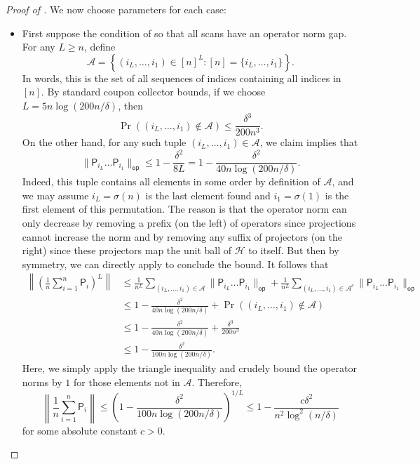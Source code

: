 \documentclass[10pt,a4paper]{amsart}
\begin{document}
\begin{proof}[Proof of ]
    We now choose parameters for each case:
    \begin{itemize}
        \item First suppose the condition of  so that all scans have an operator norm gap. For any $L\geq n$, define 
        \begin{equation*}
            \mathcal{A} =\left\{(i_L,\ldots,i_1)\in [n]^L: [n] = \{i_L,\ldots,i_1\}\right\}.
        \end{equation*}
        In words, this is the set of all sequences of indices containing all indices in $[n]$. By standard coupon collector bounds, if we choose $L=5n \log(200n/\delta)$, then
        \begin{equation*}
            \Pr((i_L,\ldots,i_1)\not\in \mathcal{A})\leq \frac{\delta^{3}}{200n^{3}}.
        \end{equation*}
        On the other hand, for any such tuple $(i_L,\ldots,i_1)\in \mathcal{A}$, we claim
         implies that
        \begin{equation*}
            \|\mathsf{P}_{i_L}\ldots \mathsf{P}_{i_1}\|_{\mathsf{op}}\leq 1-\frac{\delta^2}{8L}=1-\frac{\delta^2}{40n\log(200n/\delta)}.
        \end{equation*}
        Indeed, this tuple contains all elements in some order by definition of $\mathcal{A}$, and we may assume $i_L=\sigma(n)$ is the last element found and $i_1=\sigma(1)$ is the first element of this permutation.  The reason is that the operator norm can only decrease by removing a prefix (on the left) of operators since projections cannot increase the norm and by removing any suffix of projectors (on the right) since these projectors map the unit ball of $\mathcal{H}$ to itself. But then by symmetry, we can directly apply  to conclude the bound. It follows that
        \begin{align*}
            \left\|\left(\frac{1}{n}\sum_{i=1}^n \mathsf{P}_i\right)^L\right\|&\leq \frac{1}{n^L}\sum_{(i_L,\ldots,i_1)\in \mathcal{A}} \|\mathsf{P}_{i_L}\ldots \mathsf{P}_{i_1}\|_{\mathsf{op}}+\frac{1}{n^L}\sum_{(i_L,\ldots,i_1)\in \mathcal{A}^c} \|\mathsf{P}_{i_L}\ldots \mathsf{P}_{i_1}\|_{\mathsf{op}}\\
            &\leq 1-\frac{\delta^2}{40n\log(200n/\delta)}+\Pr((i_L,\ldots,i_1)\not\in \mathcal{A})\\
            &\leq 1-\frac{\delta^2}{40n\log(200n/\delta)}+\frac{\delta^{3}}{200n^3}\\
            &\leq 1-\frac{\delta^2}{100n\log(200n/\delta)}.
        \end{align*}
        Here, we simply apply the triangle inequality and crudely bound the operator norms by $1$ for those elements not in $\mathcal{A}$. Therefore,
        \begin{equation*}
            \left\|\frac{1}{n}\sum_{i=1}^n \mathsf{P}_i\right\|\leq \left(1-\frac{\delta^2}{100n\log(200n/\delta)}\right)^{1/L}\leq 1-\frac{c\delta^2}{n^2\log^2(n/\delta)}
        \end{equation*}
        for some absolute constant $c>0$.


\end{itemize}
\end{proof}
\end{document}
